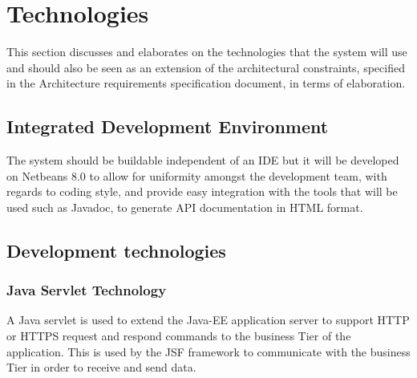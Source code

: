 \documentclass[12pt]{article}
\begin{document}


\section{Technologies}
This section discusses and elaborates on the technologies that the system will use and should also be seen as an extension of the architectural constraints, specified in the Architecture requirements specification document, in terms of elaboration.

\subsection{Integrated Development Environment}
The system should be buildable independent of an IDE but it will be developed on Netbeans 8.0 to allow for uniformity amongst the development team, with regards to coding style, and provide easy integration with the tools that will be used such as Javadoc, to generate  API documentation in HTML format.

\subsection{Development technologies}
\subsubsection{Java Servlet Technology}
A Java servlet is used to extend the Java-EE application server to support HTTP or HTTPS request and respond commands to the business Tier of the application. This is used by the JSF framework to communicate with the business Tier in order to receive and send data.
\end{document}
